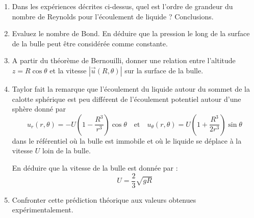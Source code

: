 {\begin{enumerate}

\item 
Dans les exp\'eriences d\'ecrites ci-dessus, quel est l'ordre de grandeur du nombre de Reynolds 
pour l'\'ecoulement de liquide ?
Conclusions.

\item Evaluez le nombre de Bond. En déduire que la pression le long de la surface de la bulle peut être considérée comme constante.


\item A partir du théorème de Bernouilli, donner une relation entre l'altitude 
$z= R \cos \theta$  et la vitesse $|\vec{u}(R,\theta)|$ sur la surface de la bulle.



\item 
Taylor fait la remarque que l'\'ecoulement du liquide autour du sommet
de la calotte sph\'erique est peu diff\'erent de l'\'ecoulement potentiel
autour d'une sph\`ere donn\'e par
$$
u_r(r, \theta) = -U\left ( 1 - \frac{R^3}{r^3} \right ) \cos\theta
\quad \mbox{et} \quad
u_\theta(r, \theta) = U\left ( 1 + \frac{R^3}{2r^3} \right ) \sin \theta
$$
dans le r\'ef\'erentiel o\`u la bulle est immobile et o\`u le liquide
se d\'eplace \`a la vitesse $U$ loin de la bulle. 

%


En déduire que la vitesse de la bulle est donnée par :
$$
U = \frac{2}{3} \sqrt{gR}
$$

\item
Confronter cette pr\'ediction th\'eorique aux valeurs obtenues exp\'erimentalement.

\end{enumerate}









}







